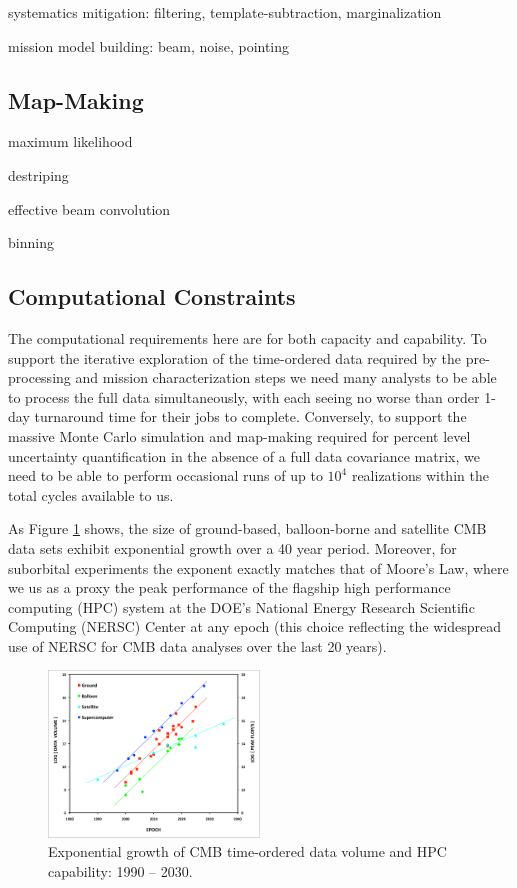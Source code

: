 systematics mitigation: filtering, template-subtraction, marginalization

mission model building: beam, noise, pointing

\subsection{Map-Making}

maximum likelihood

destriping

effective beam convolution

binning

\subsection{Computational Constraints}



The computational requirements here are for both capacity and capability. To support the iterative exploration of the time-ordered data required by the pre-processing and mission characterization steps we need many analysts to be able to process the full data simultaneously, with each seeing no worse than order 1-day turnaround time for their jobs to complete. Conversely, to support the massive Monte Carlo simulation and map-making required for percent level uncertainty quantification in the absence of a full data covariance matrix, we need to be able to perform occasional runs of up to $10^4$ realizations within the total cycles available to us.


As Figure \ref{fig_cmb_hpc_scaling} shows, the size of ground-based, balloon-borne and satellite CMB data sets exhibit exponential growth over a 40 year period. Moreover, for suborbital experiments the exponent exactly matches that of Moore's Law, where we us as a proxy the peak performance of the flagship high performance computing (HPC) system at the DOE's National Energy Research Scientific Computing (NERSC) Center at any epoch (this choice reflecting the widespread use of NERSC for CMB data analyses over the last 20 years). 



\begin{figure}[htbp]
\centering
\includegraphics[width=0.5\textwidth]{Analysis/cmb_hpc_scaling}
\caption{Exponential growth of CMB time-ordered data volume and HPC capability: 1990 -- 2030.}
\label{fig_cmb_hpc_scaling}
\end{figure}


